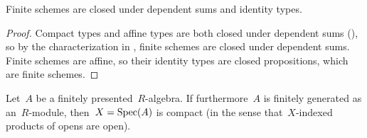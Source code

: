 \begin{lemma}
  Finite schemes are closed under dependent sums and identity types.
\end{lemma}

\begin{proof}
  Compact types and affine types are both closed under dependent sums (\cite[Lemma 2.0.3]{proper-draft}), so by the characterization in ,
  finite schemes are closed under dependent sums.
  Finite schemes are affine, so their identity types are closed propositions, which are finite schemes.
\end{proof}


\begin{proposition}\label{finite-compact}
Let~$A$ be a finitely presented~$R$-algebra. If furthermore~$A$ is finitely
generated as an~$R$-module, then~$X = \operatorname{Spec}(A)$ is compact (in the sense
that~$X$-indexed products of opens are open).\end{proposition}

